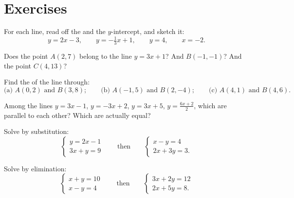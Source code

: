 \section{Exercises}

\begin{exercise}[$\star$]\label{exo:g10:lines:1}
For each line, read off the  and the $y$-intercept, and sketch it:
\[
y = 2x - 3, \qquad
y = -\tfrac13 x + 1, \qquad
y = 4, \qquad
x = -2 .
\]
\end{exercise}

\begin{exercise}[$\star$]\label{exo:g10:lines:2}
Does the point $A(2, 7)$ belong to the line $y = 3x + 1$? And $B(-1, -1)$?
And the point $C(4, 13)$?
\end{exercise}

\begin{exercise}[$\star$]\label{exo:g10:lines:3}
Find the  of the line through:
\[
\text{(a) } A(0, 2) \text{ and } B(3, 8);
\qquad
\text{(b) } A(-1, 5) \text{ and } B(2, -4);
\qquad
\text{(c) } A(4, 1) \text{ and } B(4, 6).
\]
\end{exercise}

\begin{exercise}[$\star$]\label{exo:g10:lines:4}
Among the lines $y = 3x - 1$, $y = -3x + 2$, $y = 3x + 5$,
$y = \frac{6x + 2}{2}$, which are parallel to each other? Which are
actually equal?
\end{exercise}

\begin{exercise}[$\star$]\label{exo:g10:lines:5}
Solve by substitution:
\[
\begin{cases}
y = 2x - 1 \\
3x + y = 9
\end{cases}
\qquad\text{then}\qquad
\begin{cases}
x - y = 4 \\
2x + 3y = 3 .
\end{cases}
\]
\end{exercise}

\begin{exercise}[$\star$]\label{exo:g10:lines:6}
Solve by elimination:
\[
\begin{cases}
x + y = 10 \\
x - y = 4
\end{cases}
\qquad\text{then}\qquad
\begin{cases}
3x + 2y = 12 \\
2x + 5y = 8 .
\end{cases}
\]
\end{exercise}


